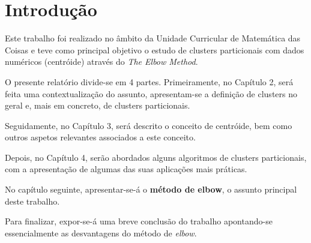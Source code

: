 \documentclass[12pt, a4paper, oneside]{scrreport}
\begin{document}
\setlength{\leftmargini}{-0,35cm}
\setlength{\leftmarginii}{-0,35cm}

\renewcommand*\contentsname{Índice}
\tableofcontents

\renewcommand{\listfigurename}{Lista de Figuras}
\listoffigures

\renewcommand{\listtablename}{Tabelas}


\newpage


\renewcommand{\chaptermark}[1]{\markboth{#1}{}}
\ofoot*{\color{gray} \leftmark\hspace{0.25cm}|\hspace{0.25cm}\thepage}


\renewcommand{\abstractname}{Sumário} 


\chapter{Introdução}



Este trabalho foi realizado no âmbito da Unidade Curricular de Matemática das Coisas e teve como principal objetivo o estudo de clusters particionais com dados numéricos (centróide) através do  \textit{The Elbow Method}.\par
O presente relatório divide-se em 4 partes. Primeiramente, no Capítulo 2, será feita uma contextualização do assunto, apresentam-se a definição de clusters no geral e, mais em concreto, de clusters particionais.\par
Seguidamente, no Capítulo 3, será descrito o conceito de centróide, bem como outros aspetos relevantes associados a este conceito.\par
Depois, no Capítulo 4, serão abordados alguns algoritmos de clusters particionais, com a apresentação de algumas das suas aplicações mais práticas.\par
No capítulo seguinte, apresentar-se-á o \textbf{método de elbow}, o assunto principal deste trabalho.\par 
Para finalizar, expor-se-á uma breve conclusão do trabalho apontando-se essencialmente as desvantagens do método de \textit{elbow}.
\end{document}
